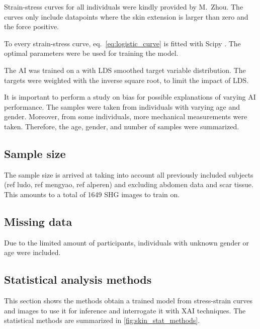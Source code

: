 Strain-stress curves for all individuals were kindly provided by M.\ Zhou.
The curves only include datapoints where the skin extension is larger than zero and the force positive.

To every strain-stress curve, eq.~\ref{eq:logistic_curve} is fitted with Scipy \cite{2020SciPy-NMeth}.
The optimal parameters were be used for training the model.

The AI was trained on a with LDS smoothed target variable distribution.
The targets were weighted with the inverse square root, to limit the impact of LDS.

It is important to perform a study on bias for possible explanations of varying AI performance.
The samples were taken from individuals with varying age and gender.
Moreover, from some individuals, more mechanical measurements were taken.
Therefore, the age, gender, and number of samples were summarized.

\subsection{Sample size}
The sample size is arrived at taking into account all previously included subjects (ref ludo, ref mengyao, ref alperen) and excluding abdomen data and scar tissue.
This amounts to a total of 1649 SHG images to train on.

\subsection{Missing data}
Due to the limited amount of participants, individuals with unknown gender or age were included.

\subsection{Statistical analysis methods}

This section shows the methods obtain a trained model from stress-strain curves and images to use it for inference and interrogate it with XAI techniques.
The statistical methods are summarized in \cref{fig:skin_stat_methods}.

